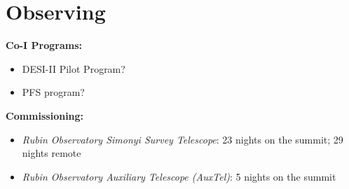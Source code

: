 \section{Observing}

\textbf{Co-I Programs:}
\begin{itemize}
    \item DESI-II Pilot Program?
    \item PFS program?
\end{itemize}

\textbf{Commissioning:}
\begin{itemize}
    \item \textit{Rubin Observatory Simonyi Survey Telescope}: 23 nights on the summit; 29 nights remote
    \item \textit{Rubin Observatory Auxiliary Telescope (AuxTel)}: 5 nights on the summit
\end{itemize}